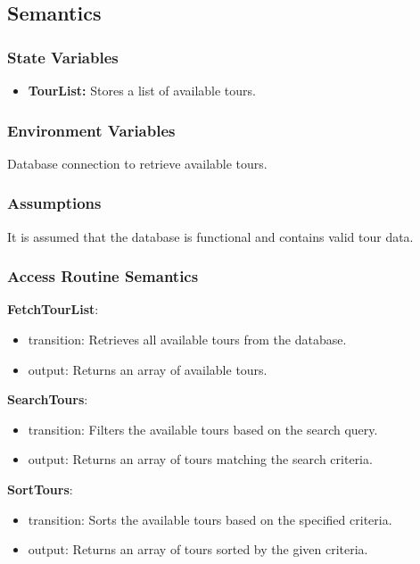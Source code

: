 \documentclass[12pt, titlepage]{article}
\begin{document}
\subsection{Semantics}

\subsubsection{State Variables}

\begin{itemize}
  \item \textbf{TourList:} Stores a list of available tours.
\end{itemize}

\subsubsection{Environment Variables}

Database connection to retrieve available tours.

\subsubsection{Assumptions}

It is assumed that the database is functional and contains valid tour data.

\subsubsection{Access Routine Semantics}

\noindent \textbf{FetchTourList}:
\begin{itemize}
  \item transition: Retrieves all available tours from the database.
  \item output: Returns an array of available tours.
\end{itemize}

\noindent \textbf{SearchTours}:
\begin{itemize}
  \item transition: Filters the available tours based on the search query.
  \item output: Returns an array of tours matching the search criteria.
\end{itemize}

\noindent \textbf{SortTours}:
\begin{itemize}
  \item transition: Sorts the available tours based on the specified criteria.
  \item output: Returns an array of tours sorted by the given criteria.
\end{itemize}
\end{document}
